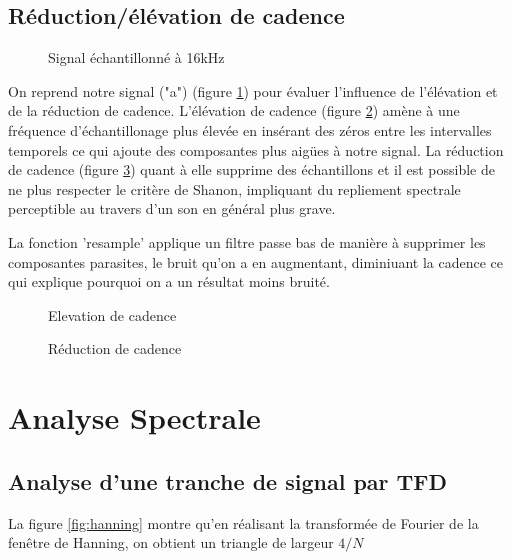\documentclass[french]{article}
\begin{document}
\FloatBarrier
\subsection{Réduction/élévation de cadence}

\begin{figure}[h!]
	\centering
	
	\caption{Signal échantillonné à 16kHz}
	\label{fig:cadence_signal}
\end{figure}

On reprend notre signal ("a") (figure \ref{fig:cadence_signal}) pour évaluer l'influence de l'élévation et de la réduction de cadence.
L'élévation de cadence (figure \ref{fig:élévation}) amène à une fréquence d'échantillonage plus élevée en insérant des zéros entre les intervalles temporels ce qui ajoute des composantes plus aigües à notre signal. La réduction de cadence (figure \ref{fig:réduction}) quant à elle supprime des échantillons et il est possible de ne plus respecter le critère de Shanon, impliquant du repliement spectrale perceptible au travers d'un son en général plus grave.

La fonction 'resample' applique un filtre passe bas de manière à supprimer les composantes parasites, le bruit qu'on a en augmentant, diminiuant la cadence ce qui explique pourquoi on a un résultat moins bruité.

\begin{figure}[h!]
	\centering
	
	\caption{Elevation de cadence}
	\label{fig:élévation}
\end{figure}

\begin{figure}[h!]
	\centering
	
	\caption{Réduction de cadence}
	\label{fig:réduction}
\end{figure}

\FloatBarrier
\section{Analyse Spectrale}
\subsection{Analyse d'une tranche de signal par TFD}

La figure \ref{fig:hanning} montre qu'en réalisant la transformée de Fourier de la fenêtre de Hanning, on obtient un triangle de largeur $4/N$
  
\end{document}
